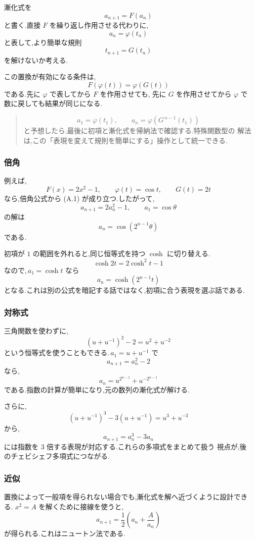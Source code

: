 漸化式を
\[
  a_{n+1}=F(a_n)
\]
と書く.直接 $F$ を繰り返し作用させる代わりに,
\[
  a_n=\varphi(t_n)
\]
と表して,より簡単な規則
\[
  t_{n+1}=G(t_n)
\]
を解けないか考える.

この置換が有効になる条件は,
\[
  F(\varphi(t))=\varphi(G(t))
  \tag{A.1}
\]
である.先に $\varphi$ で表してから $F$ を作用させても,
先に $G$ を作用させてから $\varphi$ で数に戻しても結果が同じになる.

\begin{quote}
\[
  a_1=\varphi(t_1),
  \qquad
  a_n=\varphi\left(G^{\,n-1}(t_1)\right)
\]
と予想したら,最後に初項と漸化式を帰納法で確認する.特殊関数型の
解法は,この「表現を変えて規則を簡単にする」操作として統一できる.
\end{quote}

\subsubsection{倍角}

例えば,
\[
  F(x)=2x^2-1,
  \qquad
  \varphi(t)=\cos t,
  \qquad
  G(t)=2t
\]
なら,倍角公式から (A.1) が成り立つ.したがって,
\[
  a_{n+1}=2a_n^2-1,
  \qquad
  a_1=\cos\theta
\]
の解は
\[
  a_n=\cos(2^{n-1}\theta)
\]
である.

初項が $1$ の範囲を外れると,同じ恒等式を持つ $\cosh$ に切り替える.
\[
  \cosh 2t=2\cosh^2t-1
\]
なので,\,$a_1=\cosh t$ なら
\[
  a_n=\cosh(2^{n-1}t)
\]
となる.これは別の公式を暗記する話ではなく,初項に合う表現を選ぶ話である.

\subsubsection{対称式}

三角関数を使わずに,
\[
  (u+u^{-1})^2-2=u^2+u^{-2}
  \tag{A.2}
\]
という恒等式を使うこともできる.\,$a_1=u+u^{-1}$ で
\[
  a_{n+1}=a_n^2-2
\]
なら,
\[
  a_n=u^{2^{n-1}}+u^{-2^{n-1}}
\]
である.指数の計算が簡単になり,元の数列の漸化式が解ける.

さらに,
\[
  (u+u^{-1})^3-3(u+u^{-1})=u^3+u^{-3}
\]
から,
\[
  a_{n+1}=a_n^3-3a_n
\]
には指数を $3$ 倍する表現が対応する.これらの多項式をまとめて扱う
視点が,後のチェビシェフ多項式につながる.

\subsubsection{近似}

置換によって一般項を得られない場合でも,漸化式を解へ近づくように設計できる.
$x^2=A$ を解くために接線を使うと,
\[
  a_{n+1}=\frac12\left(a_n+\frac{A}{a_n}\right)
  \tag{A.3}
\]
が得られる.これはニュートン法である.

